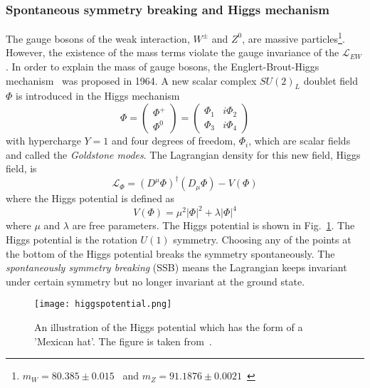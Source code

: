 \subsubsection{Spontaneous symmetry breaking and Higgs mechanism}
\label{subsubsec:sm_Higgs_mechanism}
The gauge bosons of the weak interaction, $W^{\pm}$ and $Z^{0}$, are massive particles\footnote{$m_{W}=80.385 \pm 0.015$~{\GeV} and $m_{Z}=91.1876 \pm 0.0021$~{\GeV}}.
However, the existence of the mass terms violate the gauge invariance of the $\mathcal{L}_{EW}$.
In order to explain the mass of gauge bosons, the Englert-Brout-Higgs mechanism~\cite{Higgs:1966ev, Higgs:1964pj, Higgs:1964ia, Englert:1964et, Guralnik:1964eu} was proposed in 1964.
A new scalar complex $SU(2)_{L}$ doublet field $\Phi$ is introduced in the Higgs mechanism
%
\begin{equation}
    \Phi = \left(\begin{matrix}\Phi^{+}\\\Phi^{0}\end{matrix}\right) = \left(\begin{matrix}\Phi_{1} & i\Phi_{2}\\\Phi_{3} & i\Phi_{4}\end{matrix}\right)
    \label{eq:sm_higgs_doublet}
\end{equation}
%
with hypercharge $Y = 1$ and four degrees of freedom, $\Phi_{i}$, which are scalar fields and called the \textit{Goldstone modes}.
The Lagrangian density for this new field, Higgs field, is
%
\begin{equation}
    \mathcal{L}_{\Phi} = (D^{\mu}\Phi)^{\dagger}(D_{\mu}\Phi) - V(\Phi)
    \label{eq:sm_higgs_lagrangian}
\end{equation}
%
where the Higgs potential is defined as
%
\begin{equation}
    V(\Phi) = \mu^{2}|\Phi|^{2} + \lambda|\Phi|^{4}
    \label{eq:sm_higgs_potential}
\end{equation}
%
where $\mu$ and $\lambda$ are free parameters.
The Higgs potential is shown in Fig.~\ref{fig:sm_higgs_potential}.
The Higgs potential is the rotation $U(1)$ symmetry.
Choosing any of the points at the bottom of the Higgs potential breaks the symmetry spontaneously.
The \textit{spontaneously symmetry breaking} (SSB) means the Lagrangian keeps invariant under certain symmetry but no longer invariant at the ground state.

\begin{figure}[htbp]
    \begin{center}
        \texttt{[image: higgspotential.png]}
        \caption{An illustration of the Higgs potential which has the form of a ’Mexican hat’.
        The figure is taken from~\cite{Ellis:2013jnq}.}
        \label{fig:sm_higgs_potential}
    \end{center}
\end{figure}

